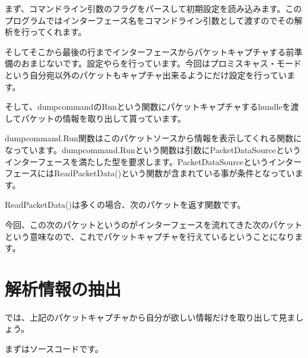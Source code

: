 まず、コマンドライン引数のフラグをパースして初期設定を読み込みます。このプログラムではインターフェース名をコマンドライン引数として渡すのでその解析を行ってくれます。

そしてそこから最後の行までインターフェースからパケットキャプチャする前準備のおまじないです。設定やらを行っています。今回はプロミスキャス・モードという自分宛以外のパケットもキャプチャ出来るようにだけ設定を行っています。

そして、dumpcommandのRunという関数にパケットキャプチャするhundleを渡してパケットの情報を取り出して貰っています。

dumpcommand.Run関数はこのパケットソースから情報を表示してくれる関数になっています。dumpcommand.Runという関数は引数にPacketDataSourceというインターフェースを満たした型を要求します。PacketDataSourceというインターフェースにはReadPacketData()という関数が含まれている事が条件となっています。

ReadPacketData()は多くの場合、次のパケットを返す関数です。

今回、この次のパケットというのがインターフェースを流れてきた次のパケットという意味なので、これでパケットキャプチャを行えているということになります。


\section{解析情報の抽出}
では、上記のパケットキャプチャから自分が欲しい情報だけを取り出して見ましょう。

まずはソースコードです。

